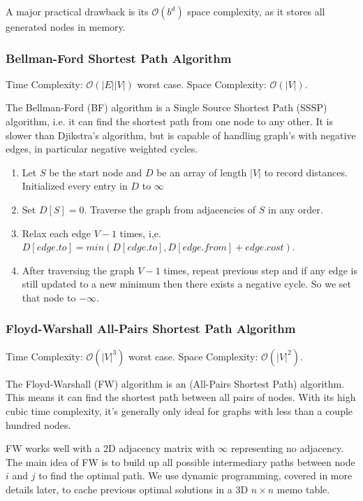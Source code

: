 \documentclass{article}
\newcommand{\bigO}{\mathcal{O}}
\begin{document}
    A major practical drawback is its $\bigO(b^d)$ space complexity, as it stores all generated nodes in memory.
   
    \subsubsection{Bellman-Ford Shortest Path Algorithm}
    Time Complexity: $\bigO (|E||V|)$ worst case. Space Complexity: $\bigO(|V|)$.
    
    The Bellman-Ford (BF) algorithm is a Single Source Shortest Path (SSSP) algorithm, i.e. it can find the shortest path from one node to any other. It is slower than Djikstra's algorithm, but is capable of handling graph's with negative edges, in particular negative weighted cycles.
    \begin{enumerate}
        \item Let $S$ be the start node and $D$ be an array of length $|V|$ to record distances. Initialized every entry in $D$ to $\infty$
        \item Set $D[S] = 0$. Traverse the graph from adjacencies of $S$ in any order. 
        \item Relax each edge $V-1$ times, i,e. $D[edge.to] = min(D[edge.to], D[edge.from] + edge.cost)$.
        \item After traversing the graph $V-1$ times, repeat previous step and if any edge is still updated to a new minimum then there exists a negative cycle. So we set that node to $-\infty$.
    \end{enumerate}
    
    
    \subsubsection{Floyd-Warshall All-Pairs Shortest Path Algorithm}
    Time Complexity: $\bigO(|V|^3)$ worst case. Space Complexity: $\bigO(|V|^2)$.
    
    The Floyd-Warshall (FW) algorithm is an (All-Pairs Shortest Path) algorithm. This means it can find the shortest path between all pairs of nodes. With its high cubic time complexity, it's generally only ideal for graphs with less than a couple hundred nodes.
    
    FW works well with a 2D adjacency matrix with $\infty$ representing no adjacency. The main idea of FW is to build up all possible intermediary paths between node $i$ and $j$ to find the optimal path. We use dynamic programming, covered in more details later, to cache previous optimal solutions in a 3D $n\times n$ memo table. 
    
\end{document}
